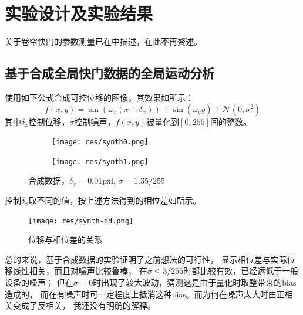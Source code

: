 
\section{实验设计及实验结果}
关于卷帘快门的参数测量已在中描述，在此不再赘述。

\subsection{基于合成全局快门数据的全局运动分析\label{sec:synth-global}}
使用如下公式合成可控位移的图像，其效果如所示：
\begin{equation}
    f(x, y) = \sin(\omega_x (x + \delta_x)) + \sin(\omega_y y) + 
    \mathcal{N}(0, \sigma^2)
    \label{eqn:synth-global}
\end{equation}
其中$\delta_x$控制位移，$\sigma$控制噪声，$f(x, y)$被量化到$[0, 255]$间的整数。
\begin{figure}[h!]\begin{center}
    \begin{subfigure}[b]{.35\figwidth}
        \centering
        \texttt{[image: res/synth0.png]}
    \end{subfigure}
    \begin{subfigure}[b]{.35\figwidth}
        \centering
        \texttt{[image: res/synth1.png]}
    \end{subfigure}
    \caption{合成数据，$\delta_x = 0.01$pxl, $\sigma = 1.35/255$}
    \label{fig:synthesis}
\end{center}\end{figure}

控制$\delta_x$取不同的值，按上述方法得到的相位差如所示。
\begin{figure}[h!]\begin{center}
    \texttt{[image: res/synth-pd.png]}
    \caption{位移与相位差的关系}
    \label{fig:synthesis:pd}
\end{center}\end{figure}

总的来说，基于合成数据的实验证明了之前想法的可行性，
显示相位差与实际位移线性相关，而且对噪声比较鲁棒，
在$\sigma \le 3/255$时都比较有效，已经远低于一般设备的噪声；
但在$\sigma=0$时出现了较大波动，猜测这是由于量化时取整带来的bias造成的，
而在有噪声时可一定程度上抵消这种bias。而为何在噪声太大时由正相关变成了反相关，
我还没有明确的解释。

